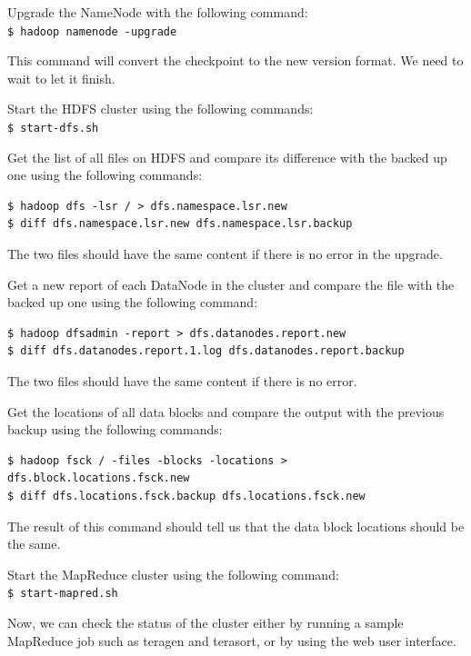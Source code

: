Upgrade the NameNode with the following command: \\
\verb|$ hadoop namenode -upgrade| 

This command will convert the checkpoint to the new version format. We need to wait to let it finish.

Start the HDFS cluster using the following commands: \\
\verb|$ start-dfs.sh| 

Get the list of all files on HDFS and compare its difference with the backed up one using the following commands:
\lstset{style=bashstyle}
\begin{lstlisting}
$ hadoop dfs -lsr / > dfs.namespace.lsr.new
$ diff dfs.namespace.lsr.new dfs.namespace.lsr.backup
\end{lstlisting}

The two files should have the same content if there is no error in the upgrade. 

Get a new report of each DataNode in the cluster and compare the file with the backed up one using the following command:
\lstset{style=bashstyle}
\begin{lstlisting}
$ hadoop dfsadmin -report > dfs.datanodes.report.new
$ diff dfs.datanodes.report.1.log dfs.datanodes.report.backup
\end{lstlisting}

The two files should have the same content if there is no error.

Get the locations of all data blocks and compare the output with the previous backup using the following commands:
\lstset{style=bashstyle}
\begin{lstlisting}
$ hadoop fsck / -files -blocks -locations > dfs.block.locations.fsck.new
$ diff dfs.locations.fsck.backup dfs.locations.fsck.new
\end{lstlisting}

The result of this command should tell us that the data block locations should be the same. 

Start the MapReduce cluster using the following command: \\ 
\verb|$ start-mapred.sh| 

Now, we can check the status of the cluster either by running a sample MapReduce job such as teragen and terasort, or by using the web user interface.

